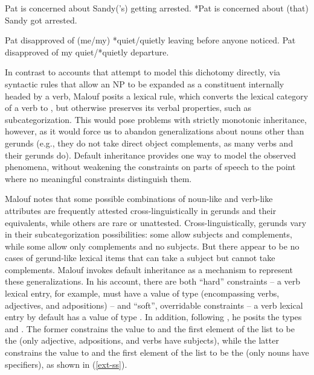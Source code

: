 \documentclass[output=paper]{langsci/langscibook}
\begin{document}
\begin{exe}
	\ex\label{ger-n}
	\begin{xlist}
		\ex\label{ger-n-a}
		Pat is concerned about Sandy('s) getting arrested.
		\ex\label{ger-n-b}
		*Pat is concerned about (that) Sandy got arrested.
	\end{xlist}	
	\ex\label{ger-v}
	\begin{xlist}
		\ex\label{ger-v-a}
		Pat disapproved of (me/my) *quiet/quietly leaving before anyone noticed.
		\ex\label{ger-v-b}
		Pat disapproved of my quiet/*quietly departure.
	\end{xlist}
\end{exe}



In contrast to accounts that attempt to model this dichotomy directly, via syntactic rules that allow an NP to be expanded as a constituent internally headed by a verb, Malouf posits a lexical rule, which converts the lexical category of a verb to , but otherwise preserves its verbal properties, such as subcategorization.
This would pose problems with strictly monotonic inheritance, however, as it would force us to abandon generalizations about nouns other than gerunds (e.g., they do not take direct object complements, as many verbs and their gerunds do).
Default inheritance provides one way to model the observed phenomena, without weakening the constraints on parts of speech to the point where no meaningful constraints distinguish them. 

Malouf notes that some possible combinations of noun-like and verb-like attributes are frequently attested cross-linguistically in gerunds and their equivalents, while others are rare or unattested.
Cross-linguistically, gerunds vary in their subcategorization possibilities: some allow subjects and complements, while some allow only complements and no subjects.
But there appear to be no cases of gerund-like lexical items that can take a subject but cannot take complements.
Malouf invokes default inheritance \citep{LC99a} as a mechanism to represent these generalizations.
In his account, there are both ``hard'' constraints -- a verb lexical entry, for example, must have a  value of type  (encompassing verbs, adjectives, and adpositions) -- and ``soft'', overridable constraints -- a verb lexical entry by default has a  value of type .
In addition, following \citet{Boumaetal2001}, he posits the types  and .
The former constrains the  value to  and the first element of the  list to be the  (only adjective, adpositions, and verbs have subjects), while the latter constrains the  value to  and the first element of the  list to be the  (only nouns have specifiers), as shown in (\ref{ext-ss}).
\end{document}
